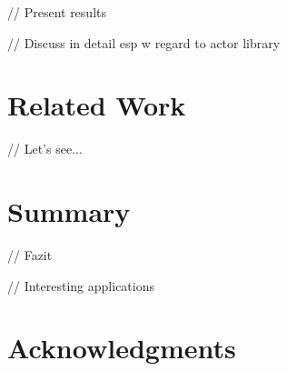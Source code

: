 \documentclass{sig-alternate}
\begin{document}
// Present results

// Discuss in detail esp w regard to actor library


\section{Related Work}

// Let's see...

\section{Summary}
                  
// Fazit

// Interesting applications

\section{Acknowledgments}


%  
\end{document}
